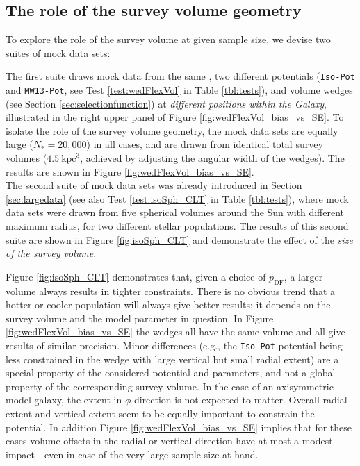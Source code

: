 \subsection{The role of the survey volume geometry} \label{sec:results_obsvolume}

To explore the role of the survey volume at given sample size, we devise two suites of mock data sets: 

The first suite draws mock data from the same \pmodel{}, two different potentials (\texttt{Iso-Pot} and \texttt{MW13-Pot}, see Test \ref{test:wedFlexVol} in Table \ref{tbl:tests}), and volume wedges (see Section \ref{sec:selectionfunction}) at {\it different positions within the Galaxy}, illustrated in the right upper panel of Figure \ref{fig:wedFlexVol_bias_vs_SE}. To isolate the role of the survey volume geometry, the mock data sets are equally large ($N_{*} = 20,000$) in all cases, and are drawn from identical total survey volumes ($4.5~\text{kpc}^3$, achieved by adjusting the angular width of the wedges). The results are shown in Figure \ref{fig:wedFlexVol_bias_vs_SE}.
\\The second suite of mock data sets was already introduced in Section \ref{sec:largedata} (see also Test \ref{test:isoSph_CLT} in Table \ref{tbl:tests}), where mock data sets were drawn from five spherical volumes around the Sun with different maximum radius, for two different stellar populations. The results of this second suite are shown in Figure \ref{fig:isoSph_CLT} and demonstrate the effect of the {\it size of the survey volume}.

Figure \ref{fig:isoSph_CLT} demonstrates that, given a choice of $p_\text{DF}$, a larger volume always results in tighter constraints. There is no obvious trend that a hotter or cooler population will always give better results; it depends on the survey volume and the model parameter in question. In Figure \ref{fig:wedFlexVol_bias_vs_SE} the wedges all have the same volume and all give results of similar precision. Minor differences (e.g., the \texttt{Iso-Pot} potential being less constrained in the wedge with large vertical but small radial extent) are a special property of the considered potential and parameters, and not a global property of the corresponding survey volume. In the case of an axisymmetric model galaxy, the extent in $\phi$ direction is not expected to matter. Overall radial extent and vertical extent seem to be equally important to constrain the potential. In addition Figure \ref{fig:wedFlexVol_bias_vs_SE} implies that for these cases volume offsets in the radial or vertical direction have at most a modest impact - even in case of the very large sample size at hand.

